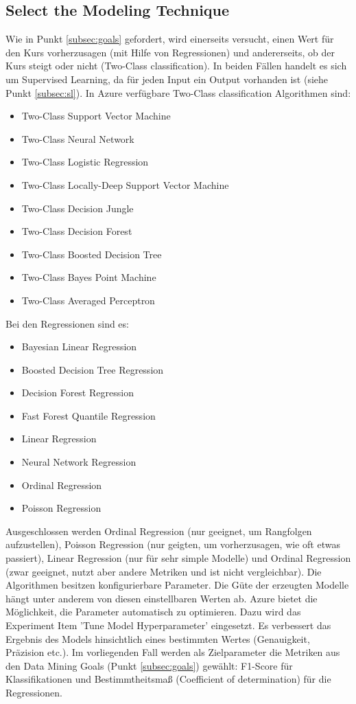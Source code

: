 \subsection{Select the Modeling Technique}
Wie in Punkt \ref{subsec:goals} gefordert, wird einerseits versucht, einen Wert für den Kurs vorherzusagen (mit Hilfe von Regressionen) und andererseits, ob der Kurs steigt oder nicht (Two-Class classification). In beiden Fällen handelt es sich um Supervised Learning, da für jeden Input ein Output vorhanden ist (siehe Punkt \ref{subsec:sl}).
In Azure verfügbare Two-Class classification Algorithmen sind:
\begin{itemize}
\item Two-Class Support Vector Machine
\item Two-Class Neural Network
\item Two-Class Logistic Regression
\item Two-Class Locally-Deep Support Vector Machine
\item Two-Class Decision Jungle
\item Two-Class Decision Forest
\item Two-Class Boosted Decision Tree
\item Two-Class Bayes Point Machine
\item Two-Class Averaged Perceptron
\end{itemize}
Bei den Regressionen sind es:
\begin{itemize}
\item Bayesian Linear Regression
\item Boosted Decision Tree Regression
\item Decision Forest Regression
\item Fast Forest Quantile Regression
\item Linear Regression
\item Neural Network Regression
\item Ordinal Regression
\item Poisson Regression
\end{itemize}
Ausgeschlossen werden Ordinal Regression (nur geeignet, um Rangfolgen aufzustellen), Poisson Regression (nur geigten, um vorherzusagen, wie oft etwas passiert), Linear Regression (nur für sehr simple Modelle) und Ordinal Regression (zwar geeignet, nutzt aber andere Metriken und ist nicht vergleichbar).
Die Algorithmen besitzen konfigurierbare Parameter. Die Güte der erzeugten Modelle hängt unter anderem von diesen einstellbaren Werten ab. Azure bietet die Möglichkeit, die Parameter automatisch zu optimieren. Dazu wird das Experiment Item 'Tune Model Hyperparameter' eingesetzt. Es verbessert das Ergebnis des Models hinsichtlich eines bestimmten Wertes (Genauigkeit, Präzision etc.). Im vorliegenden Fall werden als Zielparameter die Metriken aus den Data Mining Goals (Punkt \ref{subsec:goals}) gewählt:
F1-Score für Klassifikationen und Bestimmtheitsmaß (Coefficient of determination) für die Regressionen.

